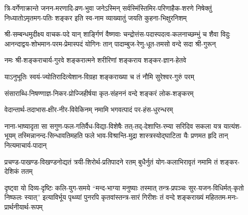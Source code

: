 
\fourlineindentedshloka
{त्रि-वर्गेणाक्रान्ते जनन-मरणादि-व्रण-भुवा}
{जनेऽस्मिन् सर्वस्मिंस्तिमिर-परिणाहैक-शरणे}
{निषेक्तुं निध्यातोऽमृतमग-पतिः शङ्कर इति}
{स्व-नाम व्याख्यातुं जयति कुहना-भिक्षुरनिशम्}


\fourlineindentedshloka
{श्री-सम्बन्धमुदीक्ष्य वाचक-पदे यान् शार्ङ्गिणं वैष्णवाः}
{चन्द्रोत्तंस-पदास्पदत्व-कलनाच्छम्भुं च शैवा विदुः}
{आनन्दाद्वय-शोभमान-परम-प्रेमास्पदं योगिनः}
{तान् पादाम्बुज-रेणु-धूत-तमसो वन्दे सदा श्री-गुरून्}


\twolineshloka
{नमः श्री-शङ्कराचार्य-गुरवे शङ्करात्मने}
{शरीरिणां शङ्कराय शङ्कर-ज्ञान-हेतवे}


\twolineshloka
{याऽनुभूतिः स्वयं-ज्योतिरादित्येशान-विग्रहा}
{शङ्कराख्या च तं नौमि सुरेश्वर-गुरुं परम्}


\twolineshloka
{संसाराब्धि-निषण्णाज्ञ-निकर-प्रोज्जिहीर्षया}
{कृत-संहननं वन्दे शङ्करं लोक-शङ्करम्}


\twolineshloka
{वेदान्तार्थ-तदाभास-क्षीर-नीर-विवेकिनम्}
{नमामि भगवत्पादं पर-हंस-धुरन्धरम्}


\fourlineindentedshloka
{नाना-भाष्यादृता सा सगुण-फल-गतिर्वैध-विद्या-विशेषैः}
{तत्-तद्-देशाप्ति-रम्या सरिदिव सकला यत्र यात्यंश-भूयम्}
{तस्मिन्नानन्द-सिन्धावतिमहति फले भाव-विश्रान्ति-मुद्रा}
{शास्त्रस्योद्घाटिता यैः प्रणमत हृदि तान् नित्यमाचार्य-पादान्}


\twolineshloka
{प्रचण्ड-पाखण्ड-विखण्डनोद्यतं त्रयी-शिरोर्थ-प्रतिपादने रतम्}
{बुधैर्नुतं योग-कलाभिरावृतं नमामि तं शङ्कर-देशिकं ततम्}


\fourlineindentedshloka
{दृष्ट्वा यो दिव्य-दृष्टिः कलि-युग-समये “मन्द-भाग्या मनुष्याः}
{तस्मात् तन्त्र-प्रपञ्चः सुर-यजन-विधिर्मत्-कृतो निष्फलः स्यात्”}
{इत्याविर्भूय पृथ्व्यां पुनरपि कृतवांस्तन्त्र-सारं गिरीशः}
{तं वन्दे शङ्कराख्यं महिततम-मनः-प्रार्थनीयार्थ-रूपम्}

